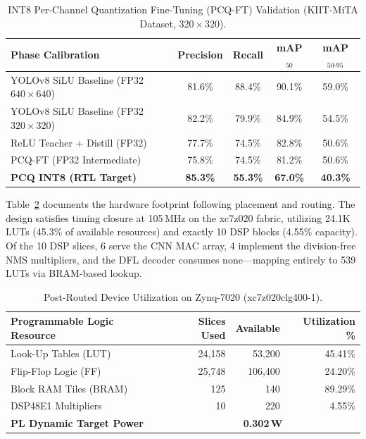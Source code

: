 \documentclass{svproc}
\begin{document}
\begin{table}[H]
\centering
\caption{INT8 Per-Channel Quantization Fine-Tuning (PCQ-FT) Validation (KIIT-MiTA Dataset, $320{\times}320$).}
\label{tab:acc}
\begin{tabular}{lcccc}
\toprule
\textbf{Phase Calibration} & \textbf{Precision} & \textbf{Recall} & \textbf{mAP$_{50}$} & \textbf{mAP$_{50\text{-}95}$} \\
\midrule
YOLOv8 SiLU Baseline (FP32 $640{\times}640$)   & 81.6\% & 88.4\% & 90.1\% & 59.0\% \\
YOLOv8 SiLU Baseline (FP32 $320{\times}320$)   & 82.2\% & 79.9\% & 84.9\% & 54.5\% \\
ReLU Teacher + Distill (FP32)                  & 77.7\% & 74.5\% & 82.8\% & 50.6\% \\
PCQ-FT (FP32 Intermediate)                     & 75.8\% & 74.5\% & 81.2\% & 50.6\% \\
\textbf{PCQ INT8 (RTL Target)}                 & \textbf{85.3\%} & \textbf{55.3\%} & \textbf{67.0\%} & \textbf{40.3\%} \\
\bottomrule
\end{tabular}
\end{table}

Table~\ref{tab:resource} documents the hardware footprint following placement and routing. The design satisfies timing closure at 105\,MHz on the xc7z020 fabric, utilizing 24.1K LUTs (45.3\% of available resources) and exactly 10 DSP blocks (4.55\% capacity). Of the 10 DSP slices, 6 serve the CNN MAC array, 4 implement the division-free NMS multipliers, and the DFL decoder consumes none---mapping entirely to 539 LUTs via BRAM-based lookup.

\begin{table}[H]
\centering
\caption{Post-Routed Device Utilization on Zynq-7020 (xc7z020clg400-1).}
\label{tab:resource}
\begin{tabular}{lrrr}
\toprule
\textbf{Programmable Logic Resource} & \textbf{Slices Used} & \textbf{Available} & \textbf{Utilization \%} \\
\midrule
Look-Up Tables (LUT)   & 24,158  & 53,200  & 45.41\% \\
Flip-Flop Logic (FF)   & 25,748  & 106,400 & 24.20\% \\
Block RAM Tiles (BRAM) & 125     & 140     & 89.29\% \\
DSP48E1 Multipliers & 10 & 220 & 4.55\% \\
\midrule
\textbf{PL Dynamic Target Power} & \multicolumn{3}{c}{\textbf{0.302\,W}} \\
\bottomrule
\end{tabular}
\end{table}
\end{document}
